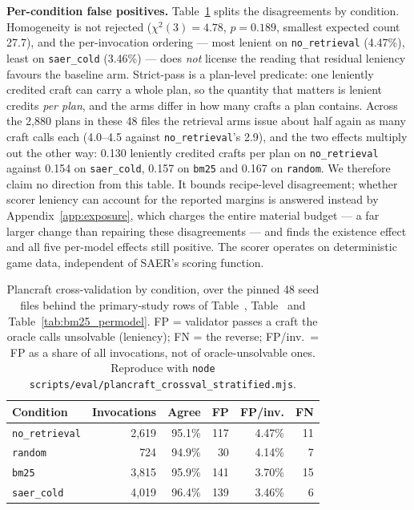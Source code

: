 \documentclass[letterpaper]{article} %
\newcommand{\appref}[1]{Appendix~\ref{#1}}
\newcommand{\bodyref}[1]{\getrefnumber{#1}}
\begin{document}
\noindent\textbf{Per-condition false positives.}
Table~\ref{tab:fpr} splits the disagreements by condition.  Homogeneity is
not rejected ($\chi^2(3){=}4.78$, $p{=}0.189$, smallest expected count 27.7),
and the per-invocation ordering --- most lenient on \texttt{no\_retrieval}
(4.47\%), least on \texttt{saer\_cold} (3.46\%) --- does \emph{not} license the
reading that residual leniency favours the baseline arm.  Strict-pass is a
plan-level predicate: one leniently credited craft can carry a whole plan, so
the quantity that matters is lenient credits \emph{per plan}, and the arms
differ in how many crafts a plan contains.  Across the 2{,}880 plans in these
48 files the retrieval arms issue about half again as many craft calls each
(4.0--4.5 against \texttt{no\_retrieval}'s 2.9), and the two effects multiply
out the other way: 0.130 leniently credited crafts per plan on
\texttt{no\_retrieval} against 0.154 on \texttt{saer\_cold}, 0.157 on
\texttt{bm25} and 0.167 on \texttt{random}.  We therefore claim no direction
from this table.  It bounds recipe-level disagreement; whether scorer leniency
can account for the reported margins is answered instead by
\appref{app:exposure}, which charges the entire material budget --- a far
larger change than repairing these disagreements --- and finds the existence
effect and all five per-model effects still positive.  The scorer operates on deterministic game data, independent of SAER's
scoring function.

\begin{table}[htbp]
\caption{Plancraft cross-validation by condition, over the pinned 48 seed
files behind the primary-study rows of Table~\bodyref{tab:main},
Table~\bodyref{tab:ablation} and Table~\ref{tab:bm25_permodel}.  FP = validator
passes a craft the oracle calls unsolvable (leniency); FN = the reverse;
FP/inv.\ = FP as a share of all invocations, not of oracle-unsolvable ones.
Reproduce with
\texttt{node scripts/eval/plancraft\_crossval\_stratified.mjs}.}
\label{tab:fpr}
\small
\centering
\begin{tabular}{lrrrrr}
\toprule
Condition & Invocations & Agree & FP & FP/inv. & FN \\
\midrule
\texttt{no\_retrieval}   & 2,619 & 95.1\% & 117 & 4.47\% & 11 \\
\texttt{random}          &   724 & 94.9\% &  30 & 4.14\% &  7 \\
\texttt{bm25}            & 3,815 & 95.9\% & 141 & 3.70\% & 15 \\
\texttt{saer\_cold}      & 4,019 & 96.4\% & 139 & 3.46\% &  6 \\
\bottomrule
\end{tabular}
\end{table}
\end{document}
